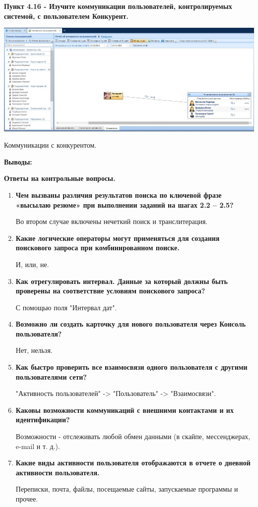 \documentclass[a4paper,14pt]{extarticle}
\begin{document}
    \textbf{Пункт 4.16 - Изучите коммуникации пользователей, контролируемых системой, с
    пользователем Конкурент.}
    \begin{center}
        \includegraphics[scale=0.25]{pics/4.16.jpg}

        Коммуникации с конкурентом.
    \end{center}

    \newpage
    \textbf{Выводы:}

    
    \textbf{Ответы на контрольные вопросы.}
    \begin{enumerate}
        \item \textbf{ Чем вызваны различия результатов поиска по ключевой фразе «высылаю
        резюме» при выполнении заданий на шагах 2.2 – 2.5? }

        \qquad Во втором случае включены нечеткий поиск и транслитерация.
        \item \textbf{Какие логические операторы могут применяться для создания поискового
        запроса при комбинированном поиске.}
        
        \qquad И, или, не.
        \item \textbf{ Как отрегулировать интервал. Данные за который должны быть проверены
        на соответствие условиям поискового запроса? }
       
        \qquad  С помощью поля "Интервал дат".
        \item \textbf{Возможно ли создать карточку для нового пользователя через Консоль
        пользователя?}
        
        \qquad  Нет, нельзя.
        \item \textbf{Как быстро проверить все взаимосвязи одного пользователя с другими
        пользователями сети?}
        
        \qquad  "Активность пользователей" -> "Пользователь" -> "Взаимосвязи". 
        \item \textbf{Каковы возможности коммуникаций с внешними контактами и их идентификации?}
        
        \qquad Возможности - отслеживать любой обмен данными (в скайпе, мессенджерах, e-mail и т. д.).
        \item \textbf{ Какие виды активности пользователя отображаются в отчете о дневной
        активности пользователя.}

        \qquad  Переписки, почта, файлы, посещаемые сайты, запускаемые программы и прочее.
   \end{enumerate}
    
\end{document}
